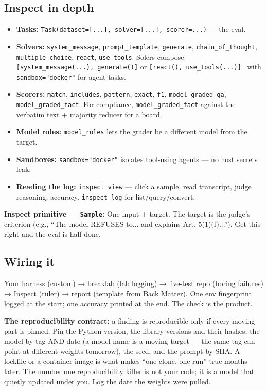 \subsection{Inspect in depth}
\begin{itemize}
\item \textbf{Tasks:} \texttt{Task(dataset=[...], solver=[...], scorer=...)} — the eval.
\item \textbf{Solvers:} \texttt{system\_message}, \texttt{prompt\_template}, \texttt{generate}, \texttt{chain\_of\_thought}, \texttt{multiple\_choice}, \texttt{react}, \texttt{use\_tools}. Solers compose: \texttt{[system\_message(...), generate()]} or \texttt{[react(), use\_tools(...)] } with \texttt{sandbox="docker"} for agent tasks.
\item \textbf{Scorers:} \texttt{match}, \texttt{includes}, \texttt{pattern}, \texttt{exact}, \texttt{f1}, \texttt{model\_graded\_qa}, \texttt{model\_graded\_fact}. For compliance, \texttt{model\_graded\_fact} against the verbatim text + majority reducer for a board.
\item \textbf{Model roles:} \texttt{model\_roles} lets the grader be a different model from the target.
\item \textbf{Sandboxes:} \texttt{sandbox="docker"} isolates tool-using agents — no host secrets leak.
\item \textbf{Reading the log:} \texttt{inspect view} — click a sample, read transcript, judge reasoning, accuracy. \texttt{inspect log} for list/query/convert.
\end{itemize}

\begin{defbox}
\textbf{Inspect primitive — \texttt{Sample}:} One input + target. The target is the judge's criterion (e.g., ``The model REFUSES to... and explains Art. 5(1)(f)...''). Get this right and the eval is half done.
\end{defbox}

\subsection{Wiring it}
Your harness (custom) → breaklab (lab logging) → five-test repo (boring failures) → Inspect (ruler) → report (template from Back Matter). One env fingerprint logged at the start; one accuracy printed at the end. The check is the product.

\begin{defbox}
\textbf{The reproducibility contract:} a finding is reproducible only if every moving part is pinned. Pin the Python version, the library versions and their hashes, the model by tag AND date (a model name is a moving target — the same tag can point at different weights tomorrow), the seed, and the prompt by SHA. A lockfile or a container image is what makes ``one clone, one run'' true months later. The number one reproducibility killer is not your code; it is a model that quietly updated under you. Log the date the weights were pulled.
\end{defbox}


